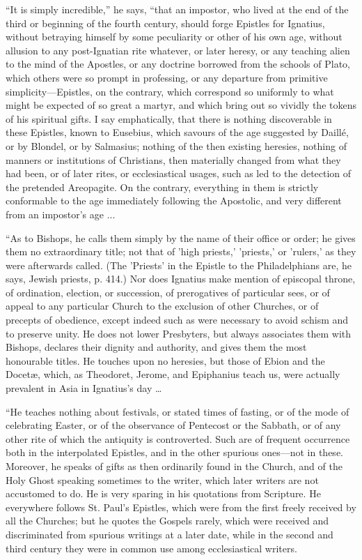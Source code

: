 ``It
is simply incredible,'' he says, ``that an impostor, who lived at the
end of the third or beginning of the fourth century, should forge
Epistles for Ignatius, without betraying himself by some peculiarity
or other of his own age, without allusion to any post-Ignatian
rite whatever, or later heresy, or any teaching alien to the mind of
the Apostles, or any doctrine borrowed from the schools of Plato,
which others were so prompt in professing, or any departure from
primitive simplicity—Epistles, on the contrary, which correspond so
uniformly to what might be expected of so great a martyr, and which
bring out so vividly the tokens of his spiritual gifts. I say
emphatically, that there is nothing discoverable in these Epistles,
known to Eusebius, which savours of the age suggested by Daillé, or
by Blondel, or by Salmasius; nothing of the then existing heresies,
nothing of manners or institutions of Christians, then materially
changed from what they had been, or of later rites, or ecclesiastical
usages, such as led to the detection of the pretended Areopagite. On
the contrary, everything in them is strictly conformable to the age
immediately following the Apostolic, and very different from an
impostor's age ...

``As
to Bishops, he calls them simply by the name of their office or order;
he gives them no extraordinary title; not that of 'high priests,'
'priests,' or 'rulers,' as they were afterwards called. (The 'Priests'
in the Epistle to the Philadelphians are, he says, Jewish priests, p.
414.) Nor does Ignatius make mention of episcopal throne, of
ordination, election, or succession, of prerogatives of particular
sees, or of appeal to any particular Church to the exclusion of other
Churches, or of precepts of obedience, except indeed such as were
necessary to avoid schism and to preserve unity. He does not lower
Presbyters, but always associates them with Bishops, declares
their dignity and authority, and gives them the most honourable
titles. He touches upon no heresies, but those of Ebion and the Docetæ,
which, as Theodoret, Jerome, and Epiphanius teach us, were actually
prevalent in Asia in Ignatius's day …

``He
teaches nothing about festivals, or stated times of fasting, or of the
mode of celebrating Easter, or of the observance of Pentecost or the
Sabbath, or of any other rite of which the antiquity is controverted.
Such are of frequent occurrence both in the interpolated Epistles, and
in the other spurious ones—not in these. Moreover, he speaks of
gifts as then ordinarily found in the Church, and of the Holy Ghost
speaking sometimes to the writer, which later writers are not
accustomed to do. He is very sparing in his quotations from Scripture.
He everywhere follows St. Paul's Epistles, which were from the first
freely received by all the Churches; but he quotes the Gospels rarely,
which were received and discriminated from spurious writings at a
later date, while in the second and third century they were in common
use among ecclesiastical writers.

